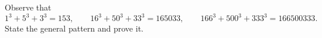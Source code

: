 Observe that
\[
1^3+5^3+3^3=153,\qquad 16^3+50^3+33^3=165033,\qquad 166^3+500^3+333^3=166500333 .
\]
State the general pattern and prove it.
